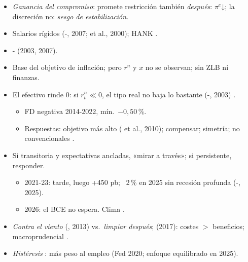\documentclass{article}
\begin{document}
\begin{columnas}
\begin{itemize}
\item \emph{Ganancia del compromiso}: promete restricción también \emph{después}: $\pi^e$↓; la discreción no: \emph{sesgo de estabilización}.
\end{itemize}
\begin{itemize}
\item Salarios rígidos (-, 2007;  et al., 2000); HANK .
\item {}- (2003, 2007).
\item Base del objetivo de inflación; pero $r^n$ y $x$ no se observan; sin ZLB ni finanzas.
\end{itemize}

\begin{itemize}
\item El efectivo rinde 0: si $r^n_t\ll0$, el tipo real no baja lo bastante (-, 2003) .
  \begin{itemize}
  \item FD negativa 2014-2022, mín.\ $-0{,}50$\,\%.
  \item Respuestas: objetivo más alto ( et al., 2010); compensar; simetría; no convencionales .
  \end{itemize}
\end{itemize}
\begin{itemize}
\item Si transitoria y expectativas ancladas, «mirar a través»; si persistente, responder.
  \begin{itemize}
  \item 2021-23: tarde, luego +450 pb; ~2\,\% en 2025 sin recesión profunda (-, 2025).
  \item 2026: el BCE no espera. Clima .
  \end{itemize}
\end{itemize}
\begin{itemize}
\item \emph{Contra el viento} (, 2013) vs.\ \emph{limpiar después};  (2017): costes $>$ beneficios; macroprudencial .
\item \emph{Histéresis} : más peso al empleo (Fed 2020; enfoque equilibrado en 2025).
\end{itemize}


\end{columnas}
\end{document}
